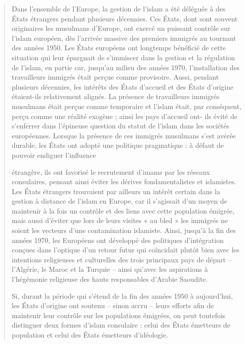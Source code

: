 \begin{quote}
Dans l'ensemble de l'Europe, la gestion de l'islam a été déléguée à des
États étrangers pendant plusieurs décennies. Ces États, dont sont
souvent originaires les musulmans d'Europe, ont exercé un puissant
contrôle sur l'islam européen, dès l'arrivée massive des premiers
immigrés au tournant des années 1950. Les États européens ont longtemps
bénéficié de cette situation qui leur épargnait de s'immiscer dans la
gestion et la régulation de l'islam, en partie car, jusqu'au milieu des
années 1970, l'installation des travailleurs immigrés était perçue comme
provisoire. Aussi, pendant plusieurs décennies, les intérêts des États
d'accueil et des États d'origine étaient-ils relativement alignés. La
présence de travailleurs immigrés musulmans était perçue comme
temporaire et l'islam était, par conséquent, perçu comme une réalité
exogène ; ainsi les pays d'accueil ont- ils évité de s'enferrer dans
l'épineuse question du statut de l'islam dans les sociétés européennes.
Lorsque la présence de ces immigrés musulmans s'est avérée durable, les
États ont adopté une politique pragmatique : à défaut de pouvoir
endiguer l'influence



étrangère, ils ont favorisé le recrutement d'imams par les réseaux
consulaires, pensant ainsi éviter les dérives fondamentalistes et
islamistes. Les États étrangers trouvaient par ailleurs un intérêt
certain dans la gestion à distance de l'islam en Europe, car il
s'agissait d'un moyen de maintenir à la fois un contrôle et des liens
avec cette population émigrée, mais aussi d'éviter que lors de leurs
visites « au bled » les immigrés ne soient les vecteurs d'une
contamination islamiste. Ainsi, jusqu'à la fin des années 1970, les
Européens ont développé des politiques d'intégration conçues dans
l'optique d'un retour futur qui coïncidait plutôt bien avec les
intentions religieuses et culturelles des trois principaux pays de
départ -- l'Algérie, le Maroc et la Turquie -- ainsi qu'avec les
aspirations à l'hégémonie religieuse des hauts responsables d'Arabie
Saoudite.

Si, durant la période qui s'étend de la fin des années 1950 à
aujourd'hui, les États d'origine ont soutenu -- sinon accru -- leurs
efforts afin de maintenir leur contrôle sur les populations émigrées, on
peut toutefois distinguer deux formes d'islam consulaire : celui des
États émetteurs de population et celui des États émetteurs d'idéologie.
\end{quote}

